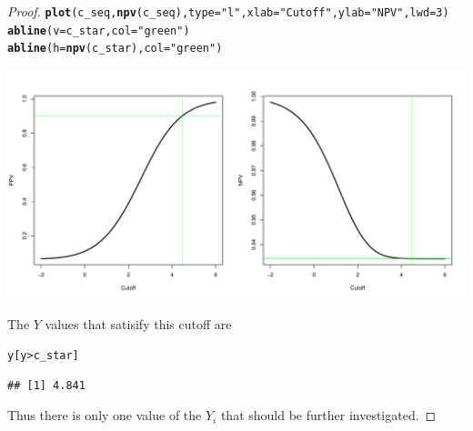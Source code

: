 \documentclass[letterpaper, 12pt]{article}\usepackage[]{graphicx}\usepackage[]{color}
\makeatletter
\def\maxwidth{ %
  \ifdim\Gin@nat@width>\linewidth
    \linewidth
  \else
    \Gin@nat@width
  \fi
}
\newcommand{\hlnum}[1]{\textcolor[rgb]{0.686,0.059,0.569}{#1}}%
\newcommand{\hlstr}[1]{\textcolor[rgb]{0.192,0.494,0.8}{#1}}%
\newcommand{\hlopt}[1]{\textcolor[rgb]{0,0,0}{#1}}%
\newcommand{\hlstd}[1]{\textcolor[rgb]{0.345,0.345,0.345}{#1}}%
\newcommand{\hlkwc}[1]{\textcolor[rgb]{0.333,0.667,0.333}{#1}}%
\newcommand{\hlkwd}[1]{\textcolor[rgb]{0.737,0.353,0.396}{\textbf{#1}}}%
\newenvironment{kframe}{%
 \def\at@end@of@kframe{}%
 \ifinner\ifhmode%
  \def\at@end@of@kframe{\end{minipage}}%
  \begin{minipage}{\columnwidth}%
 \fi\fi%
 \def\FrameCommand##1{\hskip\@totalleftmargin \hskip-\fboxsep
 \colorbox{shadecolor}{##1}\hskip-\fboxsep
     \hskip-\linewidth \hskip-\@totalleftmargin \hskip\columnwidth}%
 \MakeFramed {\advance\hsize-\width
   \@totalleftmargin\z@ \linewidth\hsize
   \@setminipage}}%
 {\par\unskip\endMakeFramed%
 \at@end@of@kframe}
\newenvironment{knitrout}{}{} %
\makeatother
\begin{document}
\begin{enumerate}
\begin{enumerate}
\begin{proof}
\begin{knitrout}
\begin{kframe}
\begin{alltt}
\hlkwd{plot}\hlstd{(c_seq,} \hlkwd{npv}\hlstd{(c_seq),} \hlkwc{type} \hlstd{=} \hlstr{"l"}\hlstd{,} \hlkwc{xlab} \hlstd{=} \hlstr{"Cutoff"}\hlstd{,} \hlkwc{ylab} \hlstd{=} \hlstr{"NPV"}\hlstd{,} \hlkwc{lwd} \hlstd{=} \hlnum{3}\hlstd{)}
\hlkwd{abline}\hlstd{(}\hlkwc{v} \hlstd{= c_star,} \hlkwc{col} \hlstd{=} \hlstr{"green"}\hlstd{)}
\hlkwd{abline}\hlstd{(}\hlkwc{h} \hlstd{=} \hlkwd{npv}\hlstd{(c_star),} \hlkwc{col} \hlstd{=} \hlstr{"green"}\hlstd{)}
\end{alltt}
\end{kframe}
\includegraphics[width=\maxwidth]{figure/unnamed-chunk-12} 

\end{knitrout}

The $Y$ values that satisify this cutoff are
\begin{knitrout}
\color{fgcolor}\begin{kframe}
\begin{alltt}
\hlstd{y[y} \hlopt{>} \hlstd{c_star]}
\end{alltt}
\begin{verbatim}
## [1] 4.841
\end{verbatim}
\end{kframe}
\end{knitrout}

Thus there is only one value of the $Y_i$ that should be further investigated. 
\end{proof}
\end{enumerate}
\end{enumerate}
\end{document}
